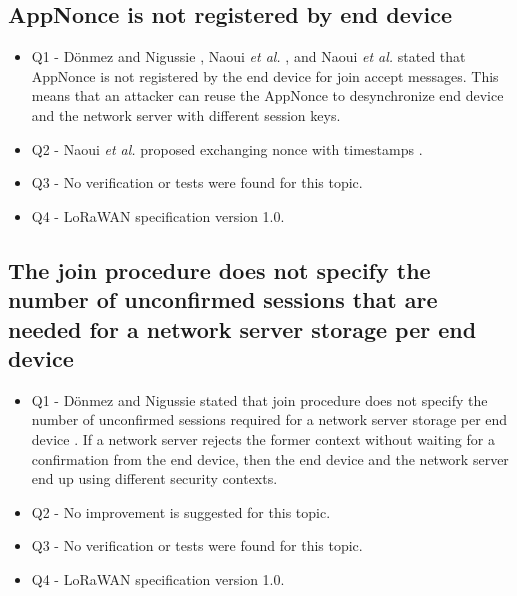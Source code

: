\documentclass[manuscript,screen,review=false]{acmart}
\begin{document}
\subsection{AppNonce is not registered by end device}

\begin{itemize}
\item Q1 - D\"onmez and Nigussie \cite{03_security_LoRaWANv1.1_scenarios}, Naoui {\it et al.} \cite{35_third_party_key_management}, and Naoui {\it et al.} \cite{98_lorawan_framework_smarthome} stated that AppNonce is not registered by the end device for join accept messages. This means that an attacker can reuse the AppNonce to desynchronize end device and the network server with different session keys.

\item Q2 - Naoui {\it et al.} proposed exchanging nonce with timestamps \cite{98_lorawan_framework_smarthome}.

\item Q3 - No verification or tests were found for this topic.

\item Q4 - LoRaWAN specification version 1.0.
\end{itemize}

\subsection{The join procedure does not specify the number of unconfirmed sessions that are needed for a network server storage per end device}

\begin{itemize}
\item Q1 - D\"onmez and Nigussie stated that join procedure does not specify the number of unconfirmed sessions required for a network server storage per end device \cite{03_security_LoRaWANv1.1_scenarios}. If a network server rejects the former context without waiting for a confirmation from the end device, then the end device and the network server end up using different security contexts. 

\item Q2 - No improvement is suggested for this topic.

\item Q3 - No verification or tests were found for this topic.

\item Q4 - LoRaWAN specification version 1.0.

\end{itemize}
\end{document}
